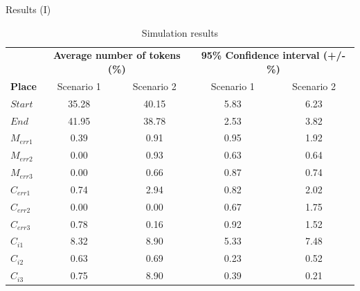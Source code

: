 \documentclass[xcolor=svgnames]{beamer}
\newcommand {\otoprule}{\midrule [\heavyrulewidth]}  %
\begin{document}
  \begin{frame}{ Results (I)}

{ \footnotesize
     \begin{table} [tp] %
            \centering
            \caption{Simulation results } %
            \label{table:simulationsAll}
            \begin{tabular}{l c c c c}
		  \toprule
        	 	        & \multicolumn{2}{c|}{ \textbf{Average number of tokens (\%)} } & \multicolumn{2}{c|}{ \textbf{95\% Confidence interval  (+/- \%)} }  \\
        	  \textbf{Place}      &  Scenario 1   &   Scenario 2  	 &  Scenario 1 	  &   Scenario 2 \\ 
		  \otoprule
        	  $Start$ &    35.28	 &    40.15        &   5.83    	 &    6.23         \\
        	  $End$   &    41.95	 &    38.78        &   2.53  	  &  3.82	\\
		\midrule
        	  $M_{err1}$	& 0.39	 & 0.91 		& 0.95	&  1.92	\\
        	  $M_{err2}$	& 0.00	 & 0.93 		& 0.63		&  0.64	\\
        	  $M_{err3}$	& 0.00   & 0.66 		& 0.87	&  0.74	\\
		\midrule
        	  $C_{err1}$	& 0.74 	 & 2.94 	& 0.82	&  2.02	\\
        	  $C_{err2}$	& 0.00	 & 0.00 	& 0.67	&  1.75	\\
        	  $C_{err3}$ 	& 0.78	 & 0.16 	& 0.92	&  1.52	\\
		\midrule
        	  $C_{i1}$ 	& 8.32	 & 8.90 	& 5.33	&  7.48	\\
              $C_{i2}$ 	& 0.63	 & 0.69 	& 0.23	&  0.52	\\
              $C_{i3}$ 	& 0.75	 & 8.90 	& 0.39	&  0.21	\\

		\bottomrule
	  \end{tabular}
        \end{table}
}
  \end{frame}
\end{document}
